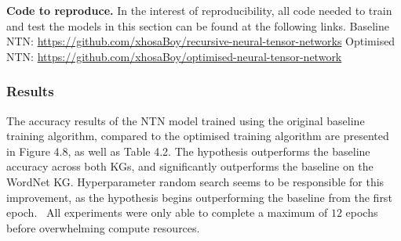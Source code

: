 \noindent \textbf{Code to reproduce.} In the interest of reproducibility, all code needed to train and test the models in this section can be found at the following links. \newline
Baseline NTN: \url{https://github.com/xhosaBoy/recursive-neural-tensor-networks} \newline
Optimised NTN: \url{https://github.com/xhosaBoy/optimised-neural-tensor-network} 

\subsubsection{Results} 
The accuracy results of the NTN model trained using the original baseline training algorithm, compared to the optimised training algorithm are presented in Figure 4.8, as well as Table 4.2. The hypothesis outperforms the baseline accuracy across both KGs, and significantly outperforms the baseline on the WordNet KG. Hyperparameter random search seems to be responsible for this improvement, as the hypothesis begins outperforming the baseline from the first epoch. \ All experiments were only able to complete a maximum of $ 12 $ epochs before overwhelming compute resources. 

\bigskip
\bigskip

